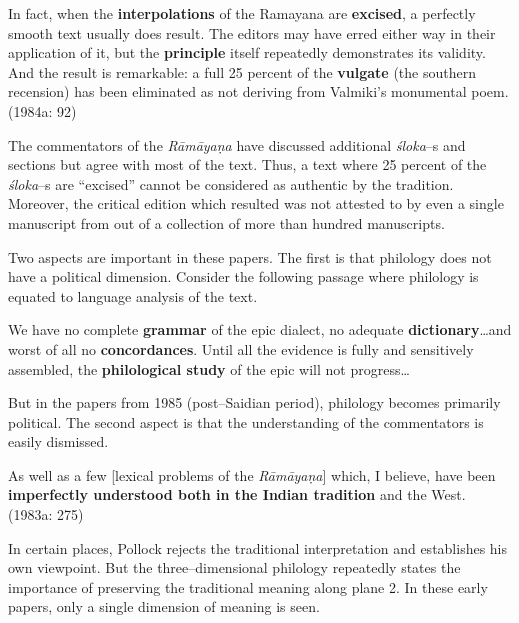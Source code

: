 \begin{myquote}
In fact, when the \textbf{interpolations} of the Ramayana are \textbf{excised}, a perfectly smooth text usually does result. The editors may have erred either way in their application of it, but the \textbf{principle} itself repeatedly demonstrates its validity. And the result is remarkable: a full 25 percent of the \textbf{vulgate} (the southern recension) has been eliminated as not deriving from Valmiki’s monumental poem. (1984a: 92)
\end{myquote}

The commentators of the \textit{Rāmāyaṇa} have discussed additional \textit{śloka}–s and sections but agree with most of the text. Thus, a text where 25 percent of the \textit{śloka}–s are “excised” cannot be considered as authentic by the tradition. Moreover, the critical edition which resulted was not attested to by even a single manuscript from out of a collection of more than hundred manuscripts.

Two aspects are important in these papers. The first is that philology does not have a political dimension. Consider the following passage where philology is equated to language analysis of the text.

\begin{myquote}
We have no complete \textbf{grammar} of the epic dialect, no adequate \textbf{dictionary}…and worst of all no \textbf{concordances}. Until all the evidence is fully and sensitively assembled, the \textbf{philological study} of the epic will not progress…
\end{myquote}

But in the papers from 1985 (post–Saidian period), philology becomes primarily political. The second aspect is that the understanding of the commentators is easily dismissed.

\begin{myquote}
As well as a few [lexical problems of the \textit{Rāmāyaṇa}] which, I believe, have been \textbf{imperfectly understood both in the Indian tradition} and the West. (1983a: 275)
\end{myquote}

In certain places, Pollock rejects the traditional interpretation and establishes his own viewpoint. But the three–dimensional philology repeatedly states the importance of preserving the traditional meaning along plane 2. In these early papers, only a single dimension of meaning is seen.

